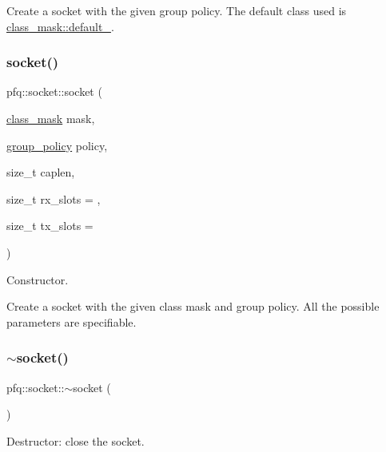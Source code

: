 Create a socket with the given group policy. The default class used is \hyperlink{namespacepfq_a96af1f5ed530eff563eb917516758fbba172b03053216c6158fe380805998ad6c}{class\+\_\+mask\+::default\+\_\+}. \mbox{\label{classpfq_1_1socket_abad0a4046d6af6c5b0b9b9759af6ff0a}} 
\subsubsection{\texorpdfstring{socket()}{socket()}\hspace{0.1cm}{\footnotesize\ttfamily [5/7]}}
{\footnotesize\ttfamily pfq\+::socket\+::socket (\begin{DoxyParamCaption}\item[{\hyperlink{namespacepfq_a96af1f5ed530eff563eb917516758fbb}{class\+\_\+mask}}]{mask,  }\item[{\hyperlink{namespacepfq_ac41249c8510558905b01fa4d866a38d7}{group\+\_\+policy}}]{policy,  }\item[{size\+\_\+t}]{caplen,  }\item[{size\+\_\+t}]{rx\+\_\+slots = {},  }\item[{size\+\_\+t}]{tx\+\_\+slots = {} }\end{DoxyParamCaption})\hspace{0.3cm}{\ttfamily [inline]}}



Constructor. 

Create a socket with the given class mask and group policy. All the possible parameters are specifiable. \mbox{\label{classpfq_1_1socket_a08fbdcc1736de36d205282ce20ffbaa3}} 
\subsubsection{\texorpdfstring{$\sim$socket()}{~socket()}}
{\footnotesize\ttfamily pfq\+::socket\+::$\sim$socket (\begin{DoxyParamCaption}{ }\end{DoxyParamCaption})\hspace{0.3cm}{\ttfamily [inline]}}



Destructor\+: close the socket. 

